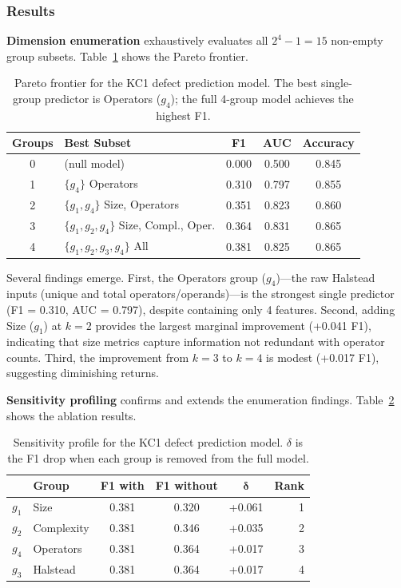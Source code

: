 \documentclass[manuscript,review,anonymous]{acmart}
\begin{document}
\subsubsection{Results}

\textbf{Dimension enumeration} exhaustively evaluates all $2^4 - 1 = 15$ non-empty group subsets.
Table~\ref{tab:defect_pareto} shows the Pareto frontier.

\begin{table}[t]
\centering
\caption{Pareto frontier for the KC1 defect prediction model. The best single-group predictor is Operators ($g_4$); the full 4-group model achieves the highest F1.}
\label{tab:defect_pareto}
\small
\begin{tabular}{@{}clccc@{}}
\toprule
\textbf{Groups} & \textbf{Best Subset} & \textbf{F1} & \textbf{AUC} & \textbf{Accuracy} \\
\midrule
0 & (null model) & 0.000 & 0.500 & 0.845 \\
1 & $\{g_4\}$ Operators & 0.310 & 0.797 & 0.855 \\
2 & $\{g_1, g_4\}$ Size, Operators & 0.351 & 0.823 & 0.860 \\
3 & $\{g_1, g_2, g_4\}$ Size, Compl., Oper. & 0.364 & 0.831 & 0.865 \\
4 & $\{g_1, g_2, g_3, g_4\}$ All & 0.381 & 0.825 & 0.865 \\
\bottomrule
\end{tabular}
\end{table}

Several findings emerge.
First, the Operators group ($g_4$)---the raw Halstead inputs (unique and total operators/operands)---is the strongest single predictor (F1 = 0.310, AUC = 0.797), despite containing only 4 features.
Second, adding Size ($g_1$) at $k=2$ provides the largest marginal improvement (+0.041 F1), indicating that size metrics capture information not redundant with operator counts.
Third, the improvement from $k=3$ to $k=4$ is modest (+0.017 F1), suggesting diminishing returns.

\textbf{Sensitivity profiling} confirms and extends the enumeration findings.
Table~\ref{tab:defect_sensitivity} shows the ablation results.

\begin{table}[t]
\centering
\caption{Sensitivity profile for the KC1 defect prediction model. $\delta$ is the F1 drop when each group is removed from the full model.}
\label{tab:defect_sensitivity}
\small
\begin{tabular}{@{}llcccr@{}}
\toprule
& \textbf{Group} & \textbf{F1 with} & \textbf{F1 without} & $\boldsymbol{\delta}$ & \textbf{Rank} \\
\midrule
$g_1$ & Size & 0.381 & 0.320 & +0.061 & 1 \\
$g_2$ & Complexity & 0.381 & 0.346 & +0.035 & 2 \\
$g_4$ & Operators & 0.381 & 0.364 & +0.017 & 3 \\
$g_3$ & Halstead & 0.381 & 0.364 & +0.017 & 4 \\
\bottomrule
\end{tabular}
\end{table}
\end{document}
